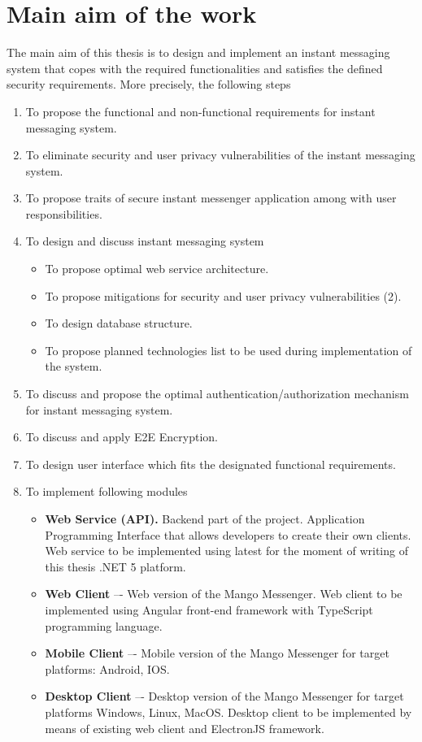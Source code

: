\chapter{Main aim of the work}\label{ch:main-aim-of-the-work}

The main aim of this thesis is to design and implement an instant messaging system
that copes with the required functionalities and satisfies the defined security requirements.
More precisely, the following steps
\begin{enumerate}
    \item To propose the functional and non-functional requirements for instant messaging system.
    \item To eliminate security and user privacy vulnerabilities of the instant messaging system.
    \item To propose traits of secure instant messenger application among with user responsibilities.
    \item To design and discuss instant messaging system
    \begin{itemize}
        \item To propose optimal web service architecture.
        \item To propose mitigations for security and user privacy vulnerabilities (2).
        \item To design database structure.
        \item To propose planned technologies list to be used during implementation of the system.
    \end{itemize}
    \item To discuss and propose the optimal authentication/authorization mechanism for instant messaging system.
    \item To discuss and apply E2E Encryption.
    \item To design user interface which fits the designated functional requirements.
    \item To implement following modules
    \begin{itemize}
        \item \textbf{Web Service (API).} Backend part of the project.
        Application Programming Interface that allows developers to create their own clients.
        Web service to be implemented using latest for the moment of writing of this thesis .NET 5 platform.
        \item \textbf{Web Client} –- Web version of the Mango Messenger.
        Web client to be implemented using Angular front-end framework with TypeScript programming language.
        \item \textbf{Mobile Client} –- Mobile version of the Mango Messenger for target platforms: Android, IOS\@.
        \item \textbf{Desktop Client} –- Desktop version of the Mango Messenger for target platforms Windows, Linux, MacOS\@.
        Desktop client to be implemented by means of existing web client and ElectronJS framework.
    \end{itemize}
\end{enumerate}